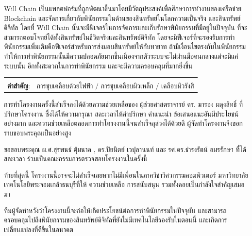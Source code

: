 \documentclass[12pt,oneside,openright,a4paper]{cpe-thai-project}
\begin{document}
\tab Will Chain เป็นแพลตฟอร์มที่ถูกพัฒนาขึ้นมาโดยมีวัตถุประสงค์เพื่อศึกษาการทำงานของเครือข่าย Blockchain  และจัดการเกี่ยวกับพินัยกรรมในด้านของสินทรัพย์ในโลกความเป็นจริง และสินทรัพย์ดิจิทัล โดยที่ Will Chain นั้นจะมีฟีเจอร์ในการจัดการและเก็บรักษาพินัยกรรมที่มีอยู่ในปัจจุบัน ที่จะสามารถตอบโจทย์ได้ทั้งสินทรัพย์ในชีวิตจริงและสินทรัพย์ดิจิทัล โดยจะมีฟีเจอร์ที่จะรองรับการทำพินัยกรรมเพิ่มเติมคือฟีเจอร์สำหรับการส่งมอบสินทรัพย์ให้กับทายาท ถ้ามีเงื่อนไขตรงกับในพินัยกรรม ทำให้การทำพินัยกรรมนั้นมีความปลอดภัยมากขึ้นเนื่องจากตัวระบบจะไม่ผ่านมือคนกลางแต่จะมีแค่ระบบนั้น อีกทั้งสะดวกในการทำพินัยกรรม และจะมีความครอบคลุมที่มากยิ่งขึ้น
\begin{flushleft}
\begin{tabular*}{\textwidth}{@{}lp{}}
 & \\

\textbf{คำสำคัญ}: & การชุบเคลือบด้วยไฟฟ้า / การชุบเคลือบผิวเหล็ก /  เคลือบผิวรังสี
\end{tabular*}
\end{flushleft}
\endabstract


\preface
\tab การทําโครงงานครั้งนี้สําเร็จลงได้ด้วยความช่วยเหลือของ ผู้ช่วยศาสตราจารย์ ดร. มารอง ผดุงสิทธิ์ ที่ปรึกษาโครงงาน ซึ่งได้ให้ความกรุณา สละเวลาให้คําปรึกษา คําแนะนํา ข้อเสนอแนะอันมีประโยชน์อย่างมาก และความช่วยเหลือตลอดการทําโครงงานนี้จนสําเร็จลุล่วงได้ด้วยดี ผู้จัดทําโครงงานจึงขอกราบขอบพระคุณเป็นอย่างสูง

\tab ขอขอบพระคุณ ผ.ศ.สุรพนธ์ ตุ้มนาค , ดร.ปิยนิตย์ เวปุลานนท์ และ รศ.ดร.ธํารงรัตน์ อมรรักษา ที่ได้สละเวลา
ร่วมเป็นคณะกรรมการตรวจสอบโครงงานในครั้งนี้ 

\tab ท้ายที่สุดนี้ โครงงานนี้อาจจะไม่สําเร็จเลยหากไม่มีเพื่อนในภาควิชาวิศวกรรมคอมพิวเตอร์ มหาวิทยาลัยเทคโนโลยีพระจอมเกล้าธนบุรีที่ให้ 
ความช่วยเหลือ การสนับสนุน รวมทั้งคอยเป็นกําลังใจสําคัญเสมอมา 

\tab ทีมผู้จัดทำหวังว่าโครงงานนี้จะก่อให้เกิดประโยชน์ต่อการทำพินัยกรรมในปัจจุบัน และสามารถครอบคลุมไปถึงพินัยกรรมของสินทรัพย์ดิจิทัลที่ยังไม่มีเทคโนโลยีรองรับในตอนนี้ และเกิดการเปลี่ยนแปลงที่ดีขึ้นในอนาคต

\tableofcontents                    
\listoftables
\listoffigures                      
\end{document}
